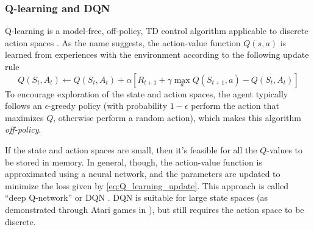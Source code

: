 \subsubsection{Q-learning and DQN}

Q-learning is a model-free, off-policy, TD control algorithm applicable to discrete action spaces \cite{watkins1989learning}. As the name suggests, the action-value function $Q(s,a)$ is learned from experiences with the environment according to the following update rule
\begin{equation}\label{eq:Q_learning_update}
    Q(S_t, A_t) \leftarrow Q(S_t, A_t) +
        \alpha \left[ R_{t+1} + \gamma \max_a Q(S_{t+1}, a) - Q(S_t, A_t) \right]
\end{equation}
To encourage exploration of the state and action spaces, the agent typically follows an $\epsilon$-greedy policy (with probability $1-\epsilon$ perform the action that maximizes $Q$, otherwise perform a random action), which makes this algorithm \emph{off-policy}.

If the state and action spaces are small, then it's feasible for all the $Q$-values to be stored in memory. In general, though, the action-value function is approximated using a neural network, and the parameters are updated to minimize the loss given by \ref{eq:Q_learning_update}. This approach is called ``deep Q-network'' or DQN \cite{mnih2013playing}. DQN is suitable for large state spaces (as demonstrated through Atari games in \cite{mnih2013playing}), but still requires the action space to be discrete.

%

